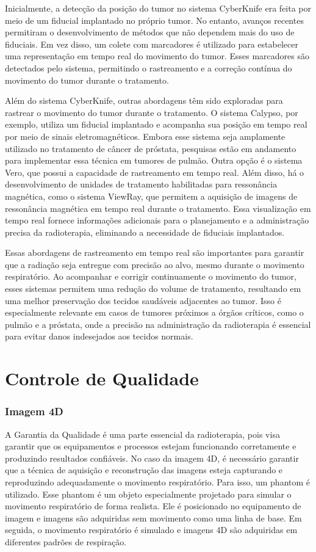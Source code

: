 \documentclass[11pt,a4paper]{article}
\newcounter{exemplo}
\begin{document}
	Inicialmente, a detecção da posição do tumor no sistema CyberKnife era feita por meio de um fiducial implantado no próprio tumor. No entanto, avanços recentes permitiram o desenvolvimento de métodos que não dependem mais do uso de fiduciais. Em vez disso, um colete com marcadores é utilizado para estabelecer uma representação em tempo real do movimento do tumor. Esses marcadores são detectados pelo sistema, permitindo o rastreamento e a correção contínua do movimento do tumor durante o tratamento.

	Além do sistema CyberKnife, outras abordagens têm sido exploradas para rastrear o movimento do tumor durante o tratamento. O sistema Calypso, por exemplo, utiliza um fiducial implantado e acompanha sua posição em tempo real por meio de sinais eletromagnéticos. Embora esse sistema seja amplamente utilizado no tratamento de câncer de próstata, pesquisas estão em andamento para implementar essa técnica em tumores de pulmão. Outra opção é o sistema Vero, que possui a capacidade de rastreamento em tempo real. Além disso, há o desenvolvimento de unidades de tratamento habilitadas para ressonância magnética, como o sistema ViewRay, que permitem a aquisição de imagens de ressonância magnética em tempo real durante o tratamento. Essa visualização em tempo real fornece informações adicionais para o planejamento e a administração precisa da radioterapia, eliminando a necessidade de fiduciais implantados.
	
	Essas abordagens de rastreamento em tempo real são importantes para garantir que a radiação seja entregue com precisão ao alvo, mesmo durante o movimento respiratório. Ao acompanhar e corrigir continuamente o movimento do tumor, esses sistemas permitem uma redução do volume de tratamento, resultando em uma melhor preservação dos tecidos saudáveis adjacentes ao tumor. Isso é especialmente relevante em casos de tumores próximos a órgãos críticos, como o pulmão e a próstata, onde a precisão na administração da radioterapia é essencial para evitar danos indesejados aos tecidos normais.

\section{Controle de Qualidade}

\subsubsection*{Imagem 4D}

	A Garantia da Qualidade é uma parte essencial da radioterapia, pois visa garantir que os equipamentos e processos estejam funcionando corretamente e produzindo resultados confiáveis. No caso da imagem 4D, é necessário garantir que a técnica de aquisição e reconstrução das imagens esteja capturando e reproduzindo adequadamente o movimento respiratório. Para isso, um phantom é utilizado. Esse phantom é um objeto especialmente projetado para simular o movimento respiratório de forma realista. Ele é posicionado no equipamento de imagem e imagens são adquiridas sem movimento como uma linha de base. Em seguida, o movimento respiratório é simulado e imagens 4D são adquiridas em diferentes padrões de respiração.
\end{document}
